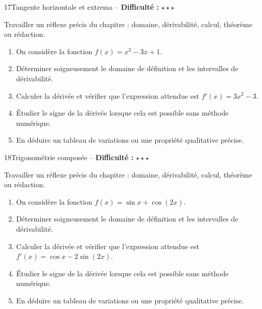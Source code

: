 \documentclass[11pt,a4paper]{article}
\newcommand{\etoiles}[1]{\textbf{Difficulté :} #1}
\begin{document}
\begin{exobox}{17}{Tangente horizontale et extrema -- \etoiles{$\star\star\star$}}

\begin{objectifbox}
Travailler un réflexe précis du chapitre : domaine, dérivabilité, calcul, théorème ou rédaction.
\end{objectifbox}

\begin{enumerate}

\item On considère la fonction $f(x)=x^3-3x+1$.

\item Déterminer soigneusement le domaine de définition et les intervalles de dérivabilité.

\item Calculer la dérivée et vérifier que l'expression attendue est $f'(x)=3x^2-3$.

\item Étudier le signe de la dérivée lorsque cela est possible sans méthode numérique.

\item En déduire un tableau de variations ou une propriété qualitative précise.

\end{enumerate}

\end{exobox}


\begin{exobox}{18}{Trigonométrie composée -- \etoiles{$\star\star\star$}}

\begin{objectifbox}
Travailler un réflexe précis du chapitre : domaine, dérivabilité, calcul, théorème ou rédaction.
\end{objectifbox}

\begin{enumerate}

\item On considère la fonction $f(x)=\sin x+\cos(2x)$.

\item Déterminer soigneusement le domaine de définition et les intervalles de dérivabilité.

\item Calculer la dérivée et vérifier que l'expression attendue est $f'(x)=\cos x-2\sin(2x)$.

\item Étudier le signe de la dérivée lorsque cela est possible sans méthode numérique.

\item En déduire un tableau de variations ou une propriété qualitative précise.

\end{enumerate}

\end{exobox}
\end{document}
